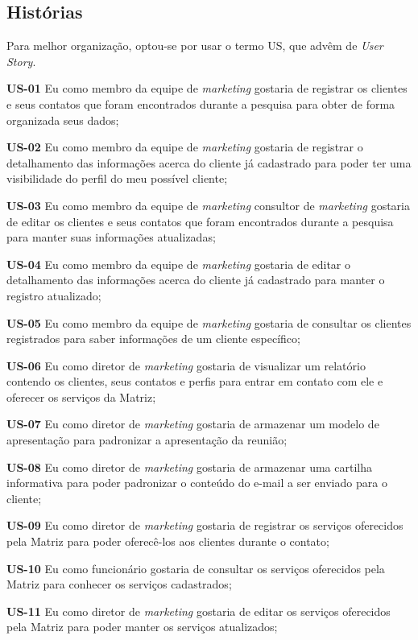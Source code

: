 \subsection{Histórias}
Para melhor organização, optou-se por usar o termo US, que advêm de \textit{User Story}.

\textbf{US-01} Eu como membro da equipe de \textit{marketing} gostaria de registrar os clientes e seus contatos que foram encontrados durante a pesquisa para obter de forma organizada seus dados;


\textbf{US-02} Eu como membro da equipe de \textit{marketing} gostaria de registrar o detalhamento das informações acerca do cliente já cadastrado para poder ter uma visibilidade do perfil do meu possível cliente;


\textbf{US-03} Eu como membro da equipe de \textit{marketing} consultor de \textit{marketing} gostaria de editar os clientes e seus contatos que foram encontrados durante a pesquisa para manter suas informações atualizadas;


\textbf{US-04} Eu como membro da equipe de \textit{marketing} gostaria de editar o detalhamento das informações acerca do cliente já cadastrado para manter o registro atualizado;


\textbf{US-05} Eu como membro da equipe de \textit{marketing} gostaria de consultar os clientes registrados para saber informações de um cliente específico;


\textbf{US-06} Eu como diretor de \textit{marketing} gostaria de visualizar um relatório contendo os clientes, seus contatos e perfis para entrar em contato com ele e oferecer os serviços da Matriz;


\textbf{US-07} Eu como diretor de \textit{marketing} gostaria de armazenar um modelo de apresentação para padronizar a apresentação da reunião;


\textbf{US-08} Eu como diretor de \textit{marketing} gostaria de armazenar uma cartilha informativa para poder padronizar o conteúdo do e-mail a ser enviado para o cliente;


\textbf{US-09} Eu como diretor de \textit{marketing} gostaria de registrar os serviços oferecidos pela Matriz para poder oferecê-los aos clientes durante o contato;


\textbf{US-10} Eu como funcionário gostaria de consultar os serviços oferecidos pela Matriz para conhecer os serviços cadastrados;


\textbf{US-11} Eu como diretor de \textit{marketing} gostaria de editar os serviços oferecidos pela Matriz para poder manter os serviços atualizados;


